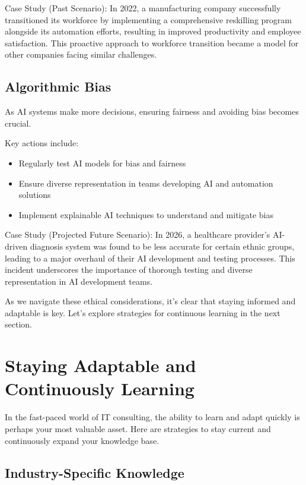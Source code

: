Case Study (Past Scenario): In 2022, a manufacturing company successfully transitioned its workforce by implementing a comprehensive reskilling program alongside its automation efforts, resulting in improved productivity and employee satisfaction. This proactive approach to workforce transition became a model for other companies facing similar challenges.

\subsection{Algorithmic Bias}

As AI systems make more decisions, ensuring fairness and avoiding bias becomes crucial.

Key actions include:

\begin{itemize}
    \item Regularly test AI models for bias and fairness
    \item Ensure diverse representation in teams developing AI and automation solutions
    \item Implement explainable AI techniques to understand and mitigate bias
\end{itemize}

Case Study (Projected Future Scenario): In 2026, a healthcare provider's AI-driven diagnosis system was found to be less accurate for certain ethnic groups, leading to a major overhaul of their AI development and testing processes. This incident underscores the importance of thorough testing and diverse representation in AI development teams.

As we navigate these ethical considerations, it's clear that staying informed and adaptable is key. Let's explore strategies for continuous learning in the next section.

\section{Staying Adaptable and Continuously Learning}

In the fast-paced world of IT consulting, the ability to learn and adapt quickly is perhaps your most valuable asset. Here are strategies to stay current and continuously expand your knowledge base.

\subsection{Industry-Specific Knowledge}

